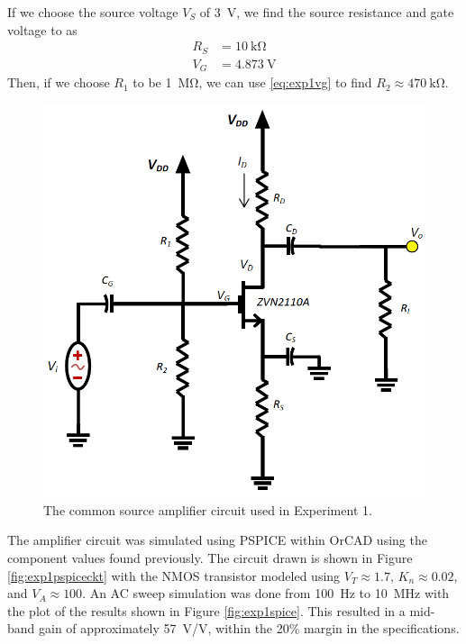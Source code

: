 \documentclass{report}
\begin{document}
If we choose the source voltage $V_S$ of \SI{3}{\V}, we find the source resistance and gate voltage to as \begin{align*}
	R_S & = \SI{10}{\kohm} \\
	V_G & = \SI{4.873}{\V}
\end{align*}
Then, if we choose $R_1$ to be \SI{1}{\Mohm}, we can use \eqref{eq:exp1vg} to find $R_2 \approx \SI{470}{\kohm}$.
\begin{figure}[h]
	\centering
	\includegraphics[width=0.5\linewidth]{exp1ckt}
	\caption{The common source amplifier circuit used in Experiment 1.}
	\label{fig:exp1ckt}
\end{figure}

The amplifier circuit was simulated using PSPICE within OrCAD using the component values found previously. The circuit drawn is shown in Figure \ref{fig:exp1pspiceckt} with the NMOS transistor modeled using $V_T \approx 1.7$, $K_n \approx 0.02$, and $V_A \approx 100$. An AC sweep simulation was done from \SI{100}{\Hz} to \SI{10}{\MHz} with the plot of the results shown in Figure \ref{fig:exp1spice}. This resulted in a mid-band gain of approximately \SI{57}{\V/\V}, within the 20\% margin in the specifications.
\end{document}
